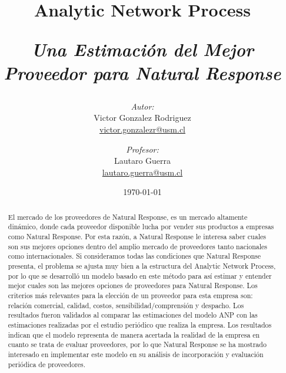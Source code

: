 \documentclass[12pt,letterpaper]{article}
\begin{document}
\begin{titlepage}
\title{Analytic Network Process \\ \begin{Large}\it Una Estimación del Mejor Proveedor para Natural Response\end{Large}} 
\author{\emph{Autor:}\\Victor Gonzalez Rodriguez\\\url{victor.gonzalezr@usm.cl} \\
\and \emph{Profesor:}\\Lautaro Guerra\\\url{lautaro.guerra@usm.cl}}
\date{\today}
\maketitle

\begin{abstract}
El mercado de los proveedores de Natural Response, es un mercado altamente dinámico, donde cada proveedor disponible lucha por vender sus productos a empresas como Natural Response. Por esta razón, a Natural Response le interesa saber cuales son sus mejores opciones dentro del amplio mercado de proveedores tanto nacionales como internacionales. Si consideramos todas las condiciones que Natural Response presenta, el problema se ajusta muy bien a la estructura del Analytic Network Process, por lo que se desarrolló un modelo basado en este método para así estimar y entender mejor cuales son las mejores opciones de proveedores para Natural Response. Los criterios más relevantes para la elección de un proveedor para esta empresa son: relación comercial, calidad, costos, sensibilidad/comprensión y despacho. Los resultados fueron validados al comparar las estimaciones del modelo ANP con las estimaciones realizadas por el estudio periódico que realiza la empresa. Los resultados indican que el modelo representa de manera acertada la realidad de la empresa en cuanto se trata de evaluar proveedores, por lo que Natural Response se ha mostrado interesado en implementar este modelo en su análisis de incorporación y evaluación periódica de proveedores.
\end{abstract}
\end{titlepage}
\newpage

\tableofcontents
\newpage
\end{document}
